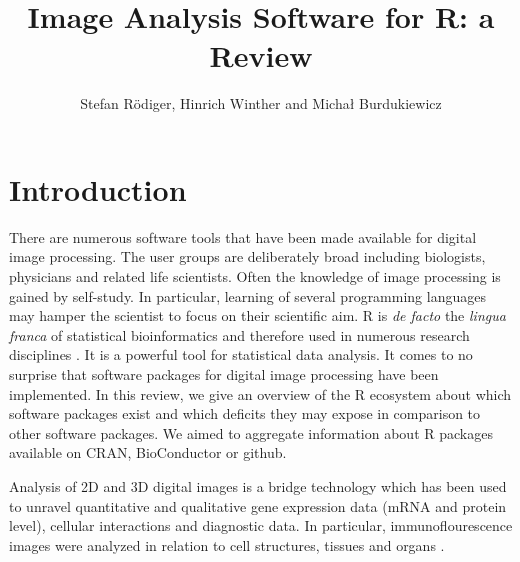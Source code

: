 \title{Image Analysis Software for R: a Review}
\author{Stefan R\"{o}diger, Hinrich Winther and Micha\l{} Burdukiewicz}

\maketitle


\section{Introduction}
There are numerous software tools that have been made available for digital 
image processing. The user groups are deliberately broad including biologists, 
physicians and related life scientists. Often the knowledge of image processing 
is gained by self-study. In particular, learning of several programming 
languages may hamper the scientist to focus on their scientific aim. R \citep{R} is \textit{de facto} 
the \textit{lingua franca} of statistical bioinformatics and 
therefore used in numerous research disciplines \citep{rodiger_r_2015}. It is a 
powerful tool for statistical data analysis. It comes to no 
surprise that software packages for digital image processing have been 
implemented. In this review, we give an overview of the R ecosystem about 
which software packages exist and which deficits they may expose in 
comparison to other software packages. We aimed to aggregate information about 
R packages available on CRAN, BioConductor or github.

Analysis of 2D and 3D digital images is a bridge technology which has been used to unravel 
quantitative and qualitative gene expression data (mRNA and protein level), cellular interactions and diagnostic data. 
In particular, immunoflourescence images were analyzed in relation to cell structures, 
tissues and organs \citep{chieco_image_2013, rodiger_highly_2013, schierack_species-specific_2014, willitzki_new_2012}.

